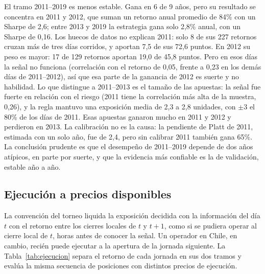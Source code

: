 \documentclass[11pt,a4paper]{article}
\begin{document}
El tramo 2011--2019 es menos estable. Gana en 6 de 9 años, pero su resultado se concentra en 2011 y 2012, que suman un retorno anual promedio de 84\% con un Sharpe de 2,6; entre 2013 y 2019 la estrategia gana solo 2,8\% anual, con un Sharpe de 0,16. Los huecos de datos no explican 2011: solo 8 de sus 227 retornos cruzan más de tres días corridos, y aportan 7,5 de sus 72,6 puntos. En 2012 su peso es mayor: 17 de 129 retornos aportan 19,0 de 45,8 puntos. Pero en esos días la señal no funciona (correlación con el retorno de 0,05, frente a 0,23 en los demás días de 2011--2012), así que esa parte de la ganancia de 2012 es suerte y no habilidad. Lo que distingue a 2011--2013 es el tamaño de las apuestas: la señal fue fuerte en relación con el riesgo (2011 tiene la correlación más alta de la muestra, 0,26), y la regla mantuvo una exposición media de 2,3 a 2,8 unidades, con $\pm3$ el 80\% de los días de 2011. Esas apuestas ganaron mucho en 2011 y 2012 y perdieron en 2013. La calibración no es la causa: la pendiente de Platt de 2011, estimada con un solo año, fue de 2,4, pero sin calibrar 2011 también gana 65\%. La conclusión prudente es que el desempeño de 2011--2019 depende de dos años atípicos, en parte por suerte, y que la evidencia más confiable es la de validación, estable año a año.

\subsection{Ejecución a precios disponibles}\label{sec:ejecucion}
La convención del torneo liquida la exposición decidida con la información del día \(t\) con el retorno entre los cierres locales de \(t\) y \(t+1\), como si se pudiera operar al cierre local de \(t\), horas antes de conocer la señal. Un operador en Chile, en cambio, recién puede ejecutar a la apertura de la jornada siguiente. La Tabla~\ref{tab:ejecucion} separa el retorno de cada jornada en sus dos tramos y evalúa la misma secuencia de posiciones con distintos precios de ejecución.
\end{document}
